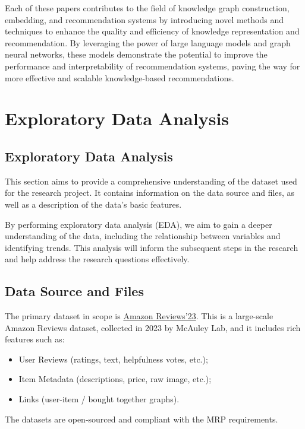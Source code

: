 \documentclass[11pt,a4paper,openany,oneside,titlepage]{article}
\begin{document}
Each of these papers contributes to the field of knowledge graph construction, embedding, and recommendation systems by introducing novel methods and techniques to enhance the quality and efficiency of knowledge representation and recommendation. By leveraging the power of large language models and graph neural networks, these models demonstrate the potential to improve the performance and interpretability of recommendation systems, paving the way for more effective and scalable knowledge-based recommendations.

\section{Exploratory Data Analysis}

\subsection{Exploratory Data Analysis}

This section aims to provide a comprehensive understanding of the dataset used for the research project. It contains information on the data source and files, as well as a description of the data's basic features. 

By performing exploratory data analysis (EDA), we aim to gain a deeper understanding of the data, including the relationship between variables and identifying trends. This analysis will inform the subsequent steps in the research and help address the research questions effectively.

\subsection{Data Source and Files}

The primary dataset in scope is \href{https://amazon-reviews-2023.github.io/index.html}{Amazon Reviews'23}. This is a large-scale Amazon Reviews dataset, collected in 2023 by McAuley Lab, and it includes rich features such as:
\begin {itemize}
\item User Reviews (ratings, text, helpfulness votes, etc.);
\item Item Metadata (descriptions, price, raw image, etc.);
\item Links (user-item / bought together graphs).
\end {itemize}

The datasets are open-sourced and compliant with the MRP requirements. 
\end{document}
